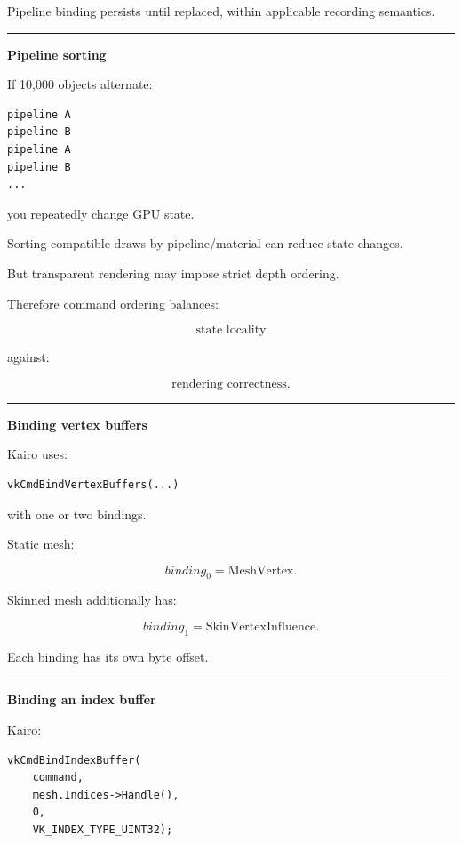 Pipeline binding persists until replaced, within applicable recording semantics.

\begin{center}\rule{0.5\linewidth}{0.5pt}\end{center}

\textbf{Pipeline sorting}

If 10,000 objects alternate:

\begin{verbatim}
pipeline A
pipeline B
pipeline A
pipeline B
...
\end{verbatim}

you repeatedly change GPU state.

Sorting compatible draws by pipeline/material can reduce state changes.

But transparent rendering may impose strict depth ordering.

Therefore command ordering balances:

\[
\boxed{
\text{state locality}
}
\]

against:

\[
\boxed{
\text{rendering correctness}.
}
\]

\begin{center}\rule{0.5\linewidth}{0.5pt}\end{center}

\textbf{Binding vertex buffers}

Kairo uses:

\begin{verbatim}
vkCmdBindVertexBuffers(...)
\end{verbatim}

with one or two bindings.

Static mesh:

\[
binding_0=\text{MeshVertex}.
\]

Skinned mesh additionally has:

\[
binding_1=\text{SkinVertexInfluence}.
\]

Each binding has its own byte offset.

\begin{center}\rule{0.5\linewidth}{0.5pt}\end{center}

\textbf{Binding an index buffer}

Kairo:

\begin{verbatim}
vkCmdBindIndexBuffer(
    command,
    mesh.Indices->Handle(),
    0,
    VK_INDEX_TYPE_UINT32);
\end{verbatim}

